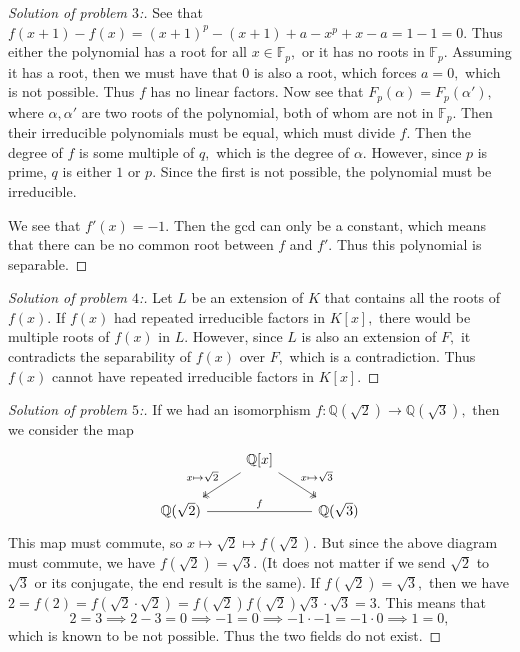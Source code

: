 \documentclass[letterpaper,11pt,twoside]{article}
\theoremstyle{proposition}
\theoremstyle{definition}
\theoremstyle{theorem}
\theoremstyle{definition}
\theoremstyle{definition}
\theoremstyle{definition}
\theoremstyle{lemma}
\theoremstyle{definition}
\theoremstyle{definition}
\theoremstyle{corollary}
\theoremstyle{definition}
\theoremstyle{definition}
\theoremstyle{definition}
\begin{document}
	\begin{proof}[Solution of problem $3$:]
	See that $f(x+1)-f(x)= (x+1)^p - (x+1) + a - x^p +x -a = 1 -1 =0.$
	Thus either the polynomial has a root for all $x \in \mathbb{F}_p,$ or it has no roots in $\mathbb{F}_p$. Assuming it has a 
	root, then we must have that $0$ is also a root, which forces $a=0,$ which is not possible. Thus $f$ has no linear factors.  Now see that $F_p(\alpha)= 
	F_p(\alpha'),$ where $\alpha, \alpha'$ are two roots of the polynomial, both of whom are not in $\mathbb{F}_p.$ Then their irreducible polynomials must 
	be equal, which must divide $f.$ Then the degree of $f$ is some multiple of $q,$ which is the degree of $\alpha.$ However, since $p$ is prime, $q$ is 
	either $1$ or $p.$ Since the first is not possible, the polynomial must be irreducible.
	
	We see that $f'(x)= -1.$ Then the gcd can only be a constant, which means that there can be no common root between $f$ and $f'.$ Thus this polynomial is 
	separable.  
\end{proof}
\begin{proof}[Solution of problem $4$:]
	Let $L$ be an extension of $K$ that contains all the roots of $f(x).$ If $f(x)$ had repeated irreducible factors in $K[x],$ there would be multiple 
	roots of $f(x)$ in $L.$ However, since $L$ is also an extension of $F,$ it contradicts the separability of $f(x)$ over $F,$ which is a contradiction. 
	Thus $f(x)$ cannot have repeated irreducible factors in $K[x].$ 
\end{proof}
	\begin{proof}[Solution of problem $5$:]
	If we had an isomorphism $f: \mathbb{Q}(\sqrt{2}) \to \mathbb{Q}(\sqrt{3}),$ then we consider the map 
	\[\begin{tikzcd}
		& {\mathbb{Q}[x]} \\
		{\mathbb{Q}(\sqrt{2})} && {\mathbb{Q}(\sqrt{3})}
		\arrow["{x \mapsto \sqrt{2}}"', two heads, from=1-2, to=2-1]
		\arrow["{x \mapsto \sqrt{3}}", two heads, from=1-2, to=2-3]
		\arrow["f", no head, from=2-1, to=2-3]
	\end{tikzcd}\]
	This map must commute, so $x \mapsto \sqrt{2} \mapsto f(\sqrt{2}).$ But since the above diagram must commute, we have $f(\sqrt{2})= \sqrt{3}.$ (It does 
	not matter if we send $\sqrt{2}$ to $\sqrt{3}$ or its conjugate, the end result is the same). If $f(\sqrt{2})=\sqrt{3},$ then we have $2=f(2)=f(\sqrt{2} 
	\cdot \sqrt{2})= f(\sqrt{2})f(\sqrt{2})\sqrt{3} \cdot \sqrt{3}=3.$ This means that $$2=3 \implies 2-3 =0 \implies -1=0 \implies -1 \cdot -1 = -1 \cdot 0 
	\implies 1=0,$$ which is known to be not possible. Thus the two fields do not exist.

\end{proof}
\end{document}
